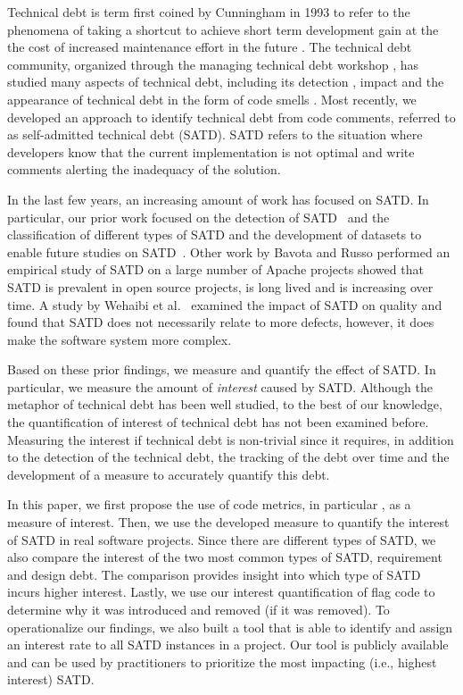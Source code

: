Technical debt is term first coined by Cunningham in 1993 to refer to the phenomena of taking a shortcut to achieve short term development gain at the the cost of increased maintenance effort in the future \cite{Cunningham1992WPM}. The technical debt community, organized through the managing technical debt workshop \cite{Falessi2014MTD}, has studied many aspects of technical debt, including its detection \cite{Zazworka2013CSE}, impact \cite{Zazworka2011MTD}
and the appearance of technical debt in the form of code smells \cite{Fontana2012MTD}. Most recently, we developed an approach to identify technical debt from code comments, referred to as self-admitted technical debt (SATD). SATD refers to the situation where developers know that the current implementation is not optimal and write comments alerting the inadequacy of the solution.

In the last few years, an increasing amount of work has focused on SATD. In particular, our prior work focused on the detection of SATD~\cite{Potdar2014ICSME} and the classification of different types of SATD and the development of datasets to enable future studies on SATD~\cite{Maldonado2015MTD}. Other work by Bavota and Russo performed an empirical study of SATD on a large number of Apache projects showed that SATD is prevalent in open source projects, is long lived and is increasing over time. A study by Wehaibi et al.~\cite{Wehaibi2016SANER} examined the impact of SATD on quality and found that SATD does not necessarily relate to more defects, however, it does make the software system more complex. 

Based on these prior findings, we measure and quantify the effect of SATD. In particular, we measure the amount of \emph{interest} caused by SATD. Although the metaphor of technical debt has been well studied, to the best of our knowledge, the quantification of interest of technical debt has not been examined before. Measuring the interest if technical debt is non-trivial since it requires, in addition to the detection of the technical debt, the tracking of the debt over time and the development of a measure to accurately quantify this debt. 


In this paper, we first propose the use of code metrics, in particular , as a measure of interest. Then, we use the developed measure to quantify the interest of SATD in real software projects. Since there are different types of SATD, we also compare the interest of the two most common types of SATD, requirement and design debt. The comparison provides insight into which type of SATD incurs higher interest. Lastly, we use our interest quantification of flag  code to determine why it was introduced and removed (if it was removed). To operationalize our findings, we also built a tool that is able to identify and assign an interest rate to all SATD instances in a project. Our tool is publicly available and can be used by practitioners to prioritize the most impacting (i.e., highest interest) SATD.

